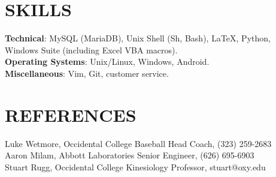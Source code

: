 \documentclass[margin]{res}
\begin{document}
\begin{resume}

\section{SKILLS}

\textbf{Technical}: MySQL (MariaDB), Unix Shell (Sh, Bash), \LaTeX, Python, Windows Suite (including Excel VBA macros).
\\
\textbf{Operating Systems}: Unix/Linux, Windows, Android.
\\
\textbf{Miscellaneous}: Vim, Git, customer service.

\section{REFERENCES}
Luke Wetmore, Occidental College Baseball Head Coach, (323) 259-2683 \\
Aaron Milam, Abbott Laboratories Senior Engineer, (626) 695-6903 \\
Stuart Rugg, Occidental College Kinesiology Professor, stuart@oxy.edu
\end{resume}
\end{document}
